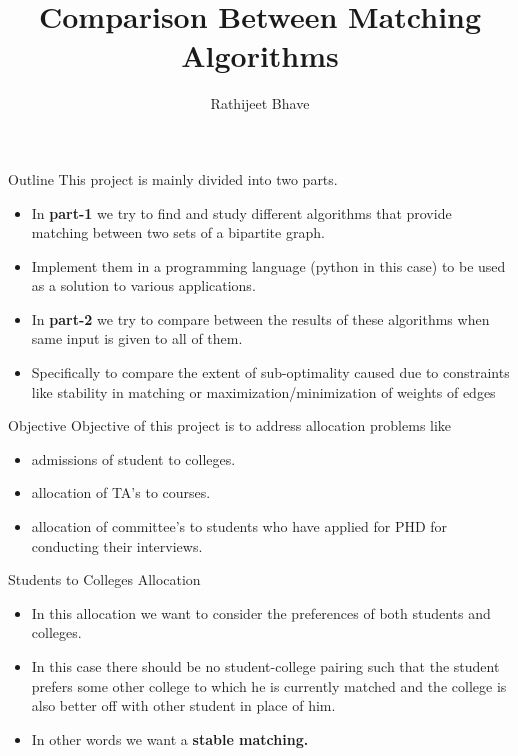 \documentclass[11pt]{beamer}
\author{Rathijeet Bhave}
\title{Comparison Between Matching Algorithms}
\theoremstyle{definition}
\begin{document}
\begin{frame}
\titlepage
\end{frame}


\begin{frame}{Outline}
This project is mainly divided into two parts.\\
\begin{itemize}


\item In \textbf{part-1} we try to find and study different algorithms that provide matching between two sets of a bipartite graph.
\item Implement them in a programming language (python in this case) to be used as a solution to various applications.
\item In \textbf{part-2} we try to compare between the results of these algorithms when same input is given to all of them.
\item Specifically to compare the extent of sub-optimality caused due to constraints like stability in matching or maximization/minimization of weights of edges
\end{itemize}
\end{frame}

\begin{frame}{Objective}
Objective of this project is to address allocation problems like 
\begin{itemize}
\item admissions of student to colleges.
\item allocation of TA's to courses.
\item allocation of committee's to students who have applied for PHD for conducting their interviews.
\end{itemize} 
\end{frame}

\begin{frame}{Students to Colleges Allocation}
\begin{itemize}
\item In this allocation we want to consider the preferences of both students and colleges.
\item In this case there should be no student-college pairing such that the student prefers some other college to which he is currently matched and the college is also better off with other student in place of him.
\item In other words we want a \textbf{stable matching.}
\end{itemize}
\end{frame}
\end{document}
